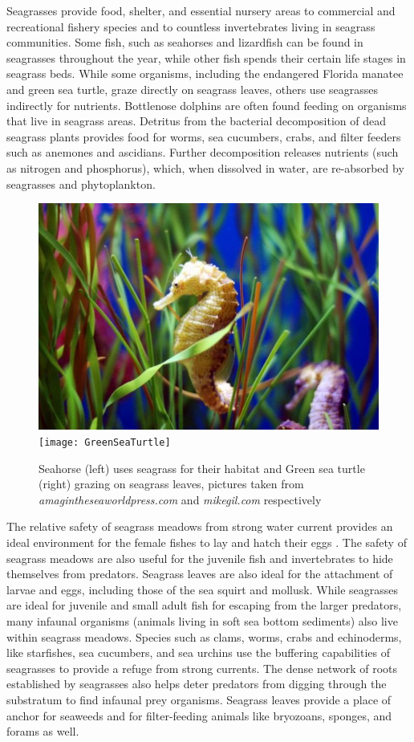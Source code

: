 \documentclass[12pt]{report}   %
\begin{document}
Seagrasses provide food, shelter, and essential nursery areas to commercial and recreational fishery species and to countless invertebrates living in seagrass communities.
Some fish, such as seahorses and lizardfish can be found in seagrasses throughout the year, while other fish spends their certain life stages in seagrass beds. While some organisms, including the endangered Florida manatee and green sea turtle, graze directly on seagrass leaves, others use seagrasses indirectly for nutrients. Bottlenose dolphins are often found feeding on organisms that live in seagrass areas. Detritus from the bacterial decomposition of dead seagrass plants provides food for worms, sea cucumbers, crabs, and filter feeders such as anemones and ascidians. Further decomposition releases nutrients (such as nitrogen and phosphorus), which, when dissolved in water, are re-absorbed by seagrasses and phytoplankton.
\begin{figure}
\centerline{ \includegraphics[scale=1.45]{SeaHorse} \texttt{[image: GreenSeaTurtle]} }
\caption[Importance of seagrass for marine life]{Seahorse (left) uses seagrass for their habitat and Green sea turtle (right) grazing on seagrass leaves, pictures taken from \textit{amagintheseaworldpress.com} and  \textit{mikegil.com} respectively  }
\end{figure}

The relative safety of seagrass meadows from strong water current provides an ideal environment for the female fishes to lay and hatch their eggs \cite{rooker98}. The safety of seagrass meadows are also useful for the juvenile fish and invertebrates to hide themselves from predators. Seagrass leaves are also ideal for the attachment of larvae and eggs, including those of the sea squirt and mollusk. While seagrasses are ideal for juvenile and small adult fish for escaping from the larger predators, many infaunal organisms (animals living in soft sea bottom sediments) also live within seagrass meadows. Species such as clams, worms, crabs and echinoderms, like starfishes, sea cucumbers, and sea urchins use the buffering capabilities of seagrasses to provide a refuge from strong currents. The dense network of roots established by seagrasses also helps deter predators from 
digging through the substratum to find 
infaunal prey organisms. Seagrass leaves provide a place of anchor for seaweeds and for filter-feeding animals like bryozoans, sponges, and forams as well.
\end{document}
